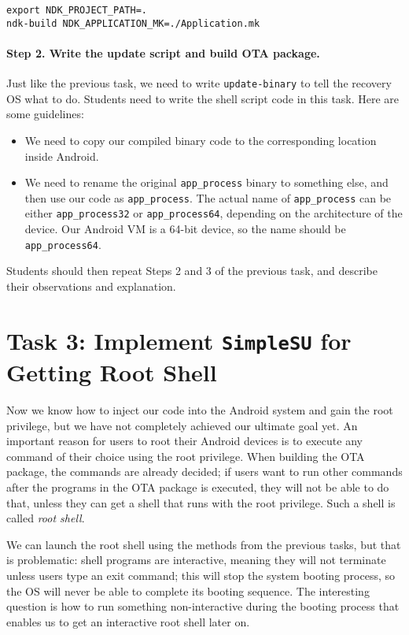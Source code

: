 \begin{lstlisting}
export NDK_PROJECT_PATH=.
ndk-build NDK_APPLICATION_MK=./Application.mk
\end{lstlisting}


\paragraph{Step 2. Write the update script and build OTA package.}
Just like the previous task, we need to write \texttt{update-binary} to 
tell the recovery OS what to do. Students need to write the shell script code in this task.
Here are some guidelines:

\begin{itemize}
  \item We need to copy our compiled binary code to the corresponding location inside Android.  

  \item We need to rename the original \texttt{app\_process} binary to something else, and then
    use our code as \texttt{app\_process}. The actual name of \texttt{app\_process} 
    can be either  \texttt{app\_process32} or \texttt{app\_process64}, depending  
    on the architecture of the device. 
    Our Android VM is a 64-bit device, so the name should be \texttt{app\_process64}. 
\end{itemize}


Students should then repeat Steps 2 and 3 of the previous task, and describe their
observations and explanation.
 


\section{Task 3: Implement \texttt{SimpleSU} for Getting Root Shell}

Now we know how to inject our code into the Android system and gain the root privilege, but we
have not completely achieved our ultimate goal yet. An important
reason for users to root their Android devices is to execute any command of their choice 
using the root privilege. When building the OTA package, the commands are already decided; if
users want to run other commands after the programs in the OTA package is executed, they will
not be able to do that, unless they can get a shell that runs with the root privilege. Such a
shell is called \textit{root shell}.  


We can launch the root shell using the methods from the previous tasks, but that is
problematic: shell programs are interactive, meaning they will not terminate unless users type
an exit command; this will stop the system booting process, so the OS will never  be able to
complete its booting sequence. The interesting question is how to run something 
non-interactive during the booting process that enables us to get an interactive root shell later on.


